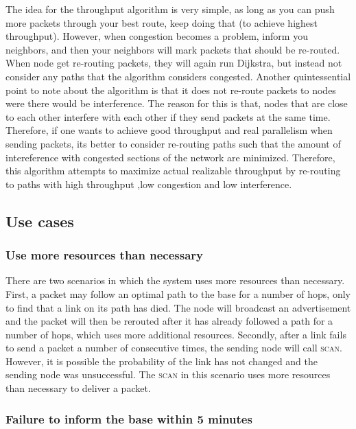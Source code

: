 \documentclass[letterpaper]{article}
\begin{document}
The idea for the throughput algorithm is very simple, as long as you can push more packets through your best route, keep doing that (to achieve highest throughput). However, when congestion becomes a problem, inform you neighbors, and then your neighbors will mark packets that should be re-routed. When node get re-routing packets, they will again run Dijkstra, but instead not consider any paths that the algorithm considers congested. Another quintessential point to note about the algorithm is that it does not re-route packets to nodes were there would be interference. The reason for this is that, nodes that are close to each other interfere with each other if they send packets at the same time. Therefore, if one wants to achieve good throughput and real parallelism when sending packets, its better to consider re-routing paths such that the amount of intereference with congested sections of the network are minimized. Therefore, this algorithm attempts to maximize actual realizable throughput by re-routing to paths with high throughput ,low congestion and low interference.


\subsection{Use cases}

\subsubsection{Use more resources than necessary}

There are two scenarios in which the system uses more resources than necessary. First, a packet may follow an optimal path
to the base for a number of hops, only to find that a link on its path has died. The node will broadcast an advertisement
and the packet will then be rerouted after it has already followed a path for a number of hops, which uses more additional
resources. Secondly, after a link fails to send a packet a number of consecutive times, the sending node will call
\textsc{scan}. However, it is possible the probability of the link has not changed and the sending node was unsuccessful.
The \textsc{scan} in this scenario uses more resources than necessary to deliver a packet.

\subsubsection{Failure to inform the base within 5 minutes}
\end{document}
